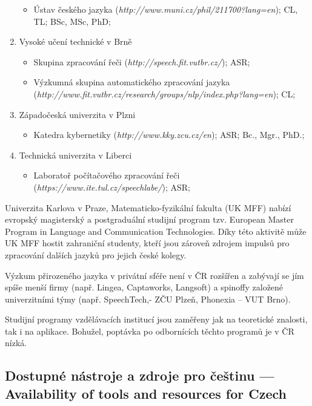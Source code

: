 \documentclass[]{../../metanetpaper}
\begin{document}
\begin{multicols}{2}
\begin{enumerate}
\begin{itemize}
  \item Ústav českého jazyka (\textit{http://www.muni.cz/phil/211700?lang=en}); CL, TL; BSc, MSc, PhD;
  \end{itemize}
\item Vysoké učení technické v Brně
  \begin{itemize}
  \item Skupina zpracování řeči (\textit{http://speech.fit.vutbr.cz/}); ASR; 
  \item Výzkumná skupina automatického zpracování jazyka (\textit{http://www.fit.vutbr.cz/research/groups/nlp/index.php?lang=en}); CL; 
  \end{itemize}
\item Západočeská univerzita v Plzni
  \begin{itemize}
  \item Katedra kybernetiky (\textit{http://www.kky.zcu.cz/en}); ASR; Bc., Mgr., PhD.;
  \end{itemize}
\item Technická univerzita v Liberci
  \begin{itemize}
  \item Laboratoř počítačového zpracování řeči (\textit{https://www.ite.tul.cz/speechlabe/}); ASR; 
  \end{itemize}
\end{enumerate}

Univerzita Karlova v Praze, Matematicko-fyzikální fakulta (UK MFF) nabízí evropský magisterský a postgraduální studijní program tzv. European Master Program in Language and Communication Technologies. Díky této aktivitě může UK MFF hostit zahraniční studenty, kteří jsou zároveň zdrojem impulsů pro zpracování dalších jazyků pro jejich české kolegy.

Výzkum přirozeného jazyka v privátní sféře není v ČR rozšířen a zabývají se jím spíše menší firmy (např. Lingea, Captaworks, Langsoft) a spinoffy založené univerzitními týmy (např. SpeechTech,- ZČU Plzeň, Phonexia – VUT Brno).

Studijní programy vzdělávacích institucí jsou zaměřeny jak na teoretické znalosti, tak i na aplikace. Bohužel, poptávka po odbornících těchto programů je v ČR nízká.

\subsection{Dostupné nástroje a zdroje pro češtinu --- Availability of tools and resources for Czech}
  

\end{multicols}
\end{document}
